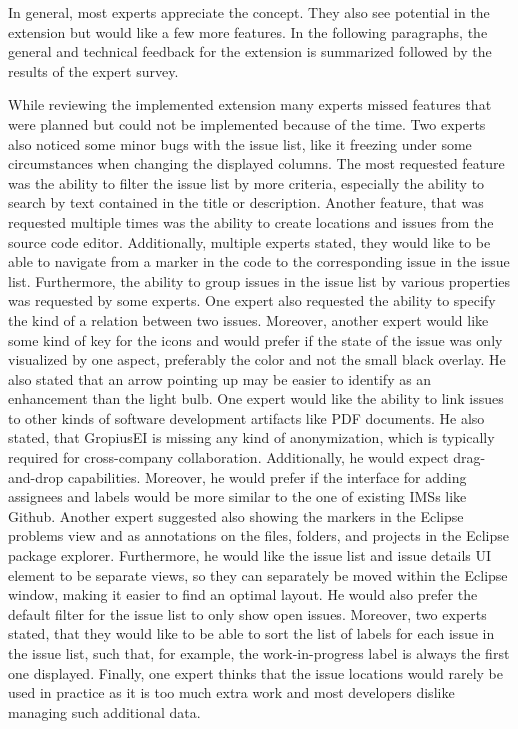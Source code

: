 In general, most experts appreciate the concept.
They also see potential in the extension but would like a few more features.
In the following paragraphs, the general and technical feedback for the extension is summarized followed by the results of the expert survey.

While reviewing the implemented extension many experts missed features that were planned but could not be implemented because of the time.
Two experts also noticed some minor bugs with the issue list, like it freezing under some circumstances when changing the displayed columns.
The most requested feature was the ability to filter the issue list by more criteria, especially the ability to search by text contained in the title or description.
Another feature, that was requested multiple times was the ability to create locations and issues from the source code editor.
Additionally, multiple experts stated, they would like to be able to navigate from a marker in the code to the corresponding issue in the issue list.
Furthermore, the ability to group issues in the issue list by various properties was requested by some experts.
One expert also requested the ability to specify the kind of a relation between two issues.
Moreover, another expert would like some kind of key for the icons and would prefer if the state of the issue was only visualized by one aspect, preferably the color and not the small black overlay. He also stated that an arrow pointing up may be easier to identify as an enhancement than the light bulb.
One expert would like the ability to link issues to other kinds of software development artifacts like \gls{PDF} documents.
He also stated, that \gls{GropiusEI} is missing any kind of anonymization, which is typically required for cross-company collaboration.
Additionally, he would expect drag-and-drop capabilities.
Moreover, he would prefer if the interface for adding assignees and labels would be more similar to the one of existing \glspl{IMS} like Github.
Another expert suggested also showing the markers in the \gls{Eclipse} problems view and as annotations on the files, folders, and projects in the \gls{Eclipse} package explorer.
Furthermore, he would like the issue list and issue details \gls{UI} element to be separate views, so they can separately be moved within the \gls{Eclipse} window, making it easier to find an optimal layout.
He would also prefer the default filter for the issue list to only show open issues.
Moreover, two experts stated, that they would like to be able to sort the list of labels for each issue in the issue list, such that, for example, the work-in-progress label is always the first one displayed.
Finally, one expert thinks that the issue locations would rarely be used in practice as it is too much extra work and most developers dislike managing such additional data.

